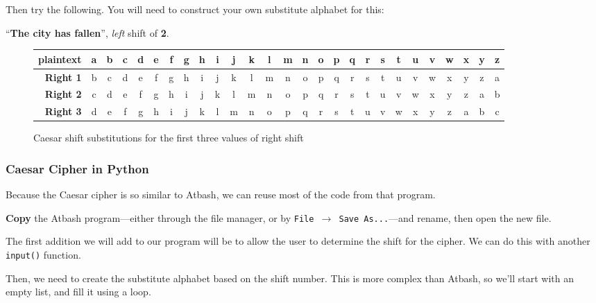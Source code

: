 		Then try the following. You will need to construct your own substitute alphabet for this:
		
		``\textbf{The city has fallen}'', \textit{left} shift of \textbf{2}.
		
		\begin{figure}
			\begin{tabular}{r|cccccccccccccccccccccccccc}
				\textbf{plaintext} & a & b & c & d & e & f & g & h & i & j & k & l & m & n & o & p & q & r & s & t & u & v & w & x & y & z \\ 
				\hline
				\textbf{Right 1} & b & c & d & e & f & g & h & i & j & k & l & m & n & o & p & q & r & s & t & u & v & w & x & y & z & a\\
				\textbf{Right 2} & c & d & e & f & g & h & i & j & k & l & m & n & o & p & q & r & s & t & u & v & w & x & y & z & a & b\\
				\textbf{Right 3} & d & e & f & g & h & i & j & k & l & m & n & o & p & q & r & s & t & u & v & w & x & y & z & a & b & c\\
			\end{tabular} 
			\caption{Caesar shift substitutions for the first three values of right shift}
			\label{fig:caeser}
		\end{figure}

	\subsubsection*{Caesar Cipher in Python}
	
		Because the Caesar cipher is so similar to Atbash, we can reuse most of the code from that program.
		
		\textbf{Copy} the Atbash program---either through the file manager, or by \texttt{File $\rightarrow$ Save As...}---and rename, then open the new file.
		
		The first addition we will add to our program will be to allow the user to determine the shift for the cipher. We can do this with another \texttt{input()} function.
		
		
		
		Then, we need to create the substitute alphabet based on the shift number. This is more complex than Atbash, so we'll start with an empty list, and fill it using a loop.
		
		
		
